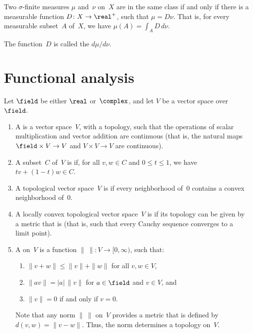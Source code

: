 \begin{thm} \label{RadonNikodym}
Two $\sigma$-finite measures $\mu$ and~$\nu$ on~$X$ are in the same class if and only if there is a measurable function $D \colon X \to \real^+$, such that $\mu = D \nu$. That is, for every measurable subset~$A$ of~$X$, we have
	$ \mu(A) = \int_A D \, d\nu $.
\end{thm}

The function~$D$ is called the  $d\mu/d\nu$.



\section{Functional analysis}

\begin{defns}
Let  $\field$ be either $\real$ or~$\complex$, and let $V$ be a vector space over~$\field$.
	\begin{enumerate}
	
	\item A  is a vector space~$V$, with a topology, such that the operations of scalar multiplication and vector addition are continuous (that is, the natural maps $\field \times V \to V$ and $V \times V \to V$ are continuous).
	
	\item A subset~$C$ of~$V$ is  if, for all $v,w \in C$ and $0 \le t \le 1$, we have $t v + (1-t) w \in C$.
	
	\item A topological vector space~$V$ is  if every neighborhood of~$0$ contains a convex neighborhood of~$0$.
	
	\item A locally convex topological vector space~$V$ is  if its topology can be given by a metric that is  (that is, such that every Cauchy sequence converges to a limit point).
	
	\item A  on~$V$ is a function $\| \ \| \colon V \to [0,\infty)$, such that:
	\noprelistbreak
		\begin{enumerate}
		\item $\| v + w \| \le \| v \| + \| w \|$ for all $v , w \in V$,
		\item $\| av \| = |a| \, \|v\|$ for $a \in \field$ and $v \in V$,
		and
		\item $\|v\| = 0$ if and only if $v = 0$.
		\end{enumerate}
	Note that any norm $\|\ \|$ on~$V$ provides a metric that is defined by $d(v,w) = \| v - w \|$. Thus, the norm determines a topology on~$V$.
	

\end{enumerate}
\end{defns}
